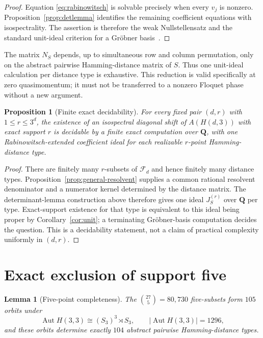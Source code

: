 \documentclass[11pt,reqno]{amsart}
\newtheorem{proposition}[theorem]{Proposition}
\newtheorem{lemma}[theorem]{Lemma}
\theoremstyle{definition}
\theoremstyle{remark}
\DeclareMathOperator{\Aut}{Aut}
\newcommand{\Q}{\mathbf Q}
\begin{document}
\begin{proof}
Equation \eqref{eq:rabinowitsch} is solvable precisely when every $v_j$ is
nonzero.  Proposition~\ref{prop:detlemma} identifies the remaining
coefficient equations with isospectrality.  The assertion is therefore the
weak Nullstellensatz and the standard unit-ideal criterion for a Gr\"obner
basis~\cite{cox}.
\end{proof}

The matrix $N_S$ depends, up to simultaneous row and column permutation,
only on the abstract pairwise Hamming-distance matrix of $S$.  Thus one
unit-ideal calculation per distance type is exhaustive.  This reduction is
valid specifically at zero quasimomentum; it must not be transferred to a
nonzero Floquet phase without a new argument.

\begin{proposition}[Finite exact decidability]\label{prop:finite-decision}
For every fixed pair $(d,r)$ with $1\leq r\leq3^d$, the existence of an
isospectral diagonal shift of $A(H(d,3))$ with exact support $r$ is decidable
by a finite exact computation over $\Q$, with one Rabinowitsch-extended
coefficient ideal for each realizable $r$-point Hamming-distance type.
\end{proposition}

\begin{proof}
There are finitely many $r$-subsets of $\mathcal F_d$ and hence finitely many
distance types.  Proposition~\ref{prop:general-resolvent} supplies a common
rational resolvent denominator and a numerator kernel determined by the
distance matrix.  The determinant-lemma construction above therefore gives
one ideal $J_S^{(r)}$ over $\Q$ per type.  Exact-support existence for that
type is equivalent to this ideal being proper by
Corollary~\ref{cor:unit}; a terminating Gr\"obner-basis computation decides
the question.  This is a decidability statement, not a claim of practical
complexity uniformly in $(d,r)$.
\end{proof}

\section{Exact exclusion of support five}\label{sec:support-five}

\begin{lemma}[Five-point completeness]\label{lem:five-completeness}
The $\binom{27}{5}=80{,}730$ five-subsets form $105$ orbits under
\[
 \Aut H(3,3)\cong(S_3)^3\rtimes S_3,
 \qquad |\Aut H(3,3)|=1296,
\]
and these orbits determine exactly $104$ abstract pairwise Hamming-distance
types.
\end{lemma}
\end{document}
